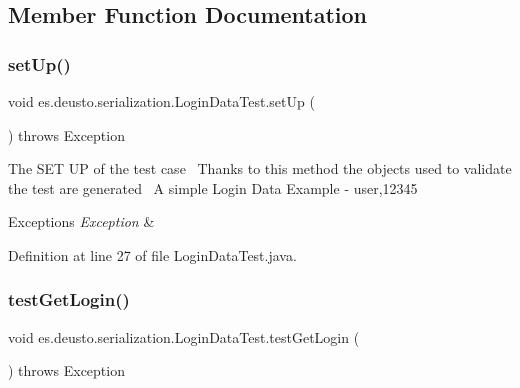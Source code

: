 \subsection{Member Function Documentation}
\mbox{\label{classes_1_1deusto_1_1serialization_1_1_login_data_test_ac6ebc4ad7913f80cdd7e5ca1de3bc8c3}} 
\subsubsection{\texorpdfstring{set\+Up()}{setUp()}}
{\footnotesize\ttfamily void es.\+deusto.\+serialization.\+Login\+Data\+Test.\+set\+Up (\begin{DoxyParamCaption}{ }\end{DoxyParamCaption}) throws Exception}

The S\+ET UP of the test case~\newline
Thanks to this method the objects used to validate the test are generated~\newline
A simple Login Data Example -\/ user,12345 
\begin{DoxyExceptions}{Exceptions}
{\em Exception} & \\
\hline
\end{DoxyExceptions}


Definition at line 27 of file Login\+Data\+Test.\+java.

\mbox{\label{classes_1_1deusto_1_1serialization_1_1_login_data_test_af8335d8d384051b02dc6bb2db7d6c9e2}} 
\subsubsection{\texorpdfstring{test\+Get\+Login()}{testGetLogin()}}
{\footnotesize\ttfamily void es.\+deusto.\+serialization.\+Login\+Data\+Test.\+test\+Get\+Login (\begin{DoxyParamCaption}{ }\end{DoxyParamCaption}) throws Exception}

